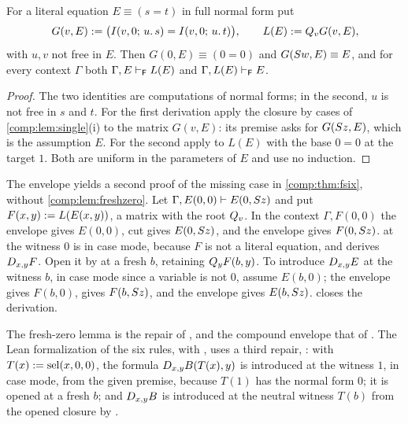 \begin{lemma}
\label{comp:lem:envelope}
For a literal equation $E\equiv(s=t)$ in full normal form put
\[
 G(v,E)\mathrel{:=}\bigl(I(v,0;\,u.\,s)=I(v,0;\,u.\,t)\bigr),\qquad
 L(E)\mathrel{:=}Q_{v}G(v,E),
\]
with $u,v$ not free in $E$. Then $G(0,E)\equiv(0=0)$ and
$G(S w,E)\equiv E$, and for every context $\Gamma$ both
$\Gamma,E\vdash_{\mathsf F}L(E)$ and $\Gamma,L(E)\vdash_{\mathsf F}E$.
\end{lemma}

\begin{proof}
The two identities are computations of normal forms; in the second, $u$ is
not free in $s$ and $t$. For the first derivation apply the closure by cases
of \cref{comp:lem:single}(i) to the matrix $G(v,E)$: its premise asks for
$G(S z,E)$, which is the assumption $E$. For the second apply
 to $L(E)$ with the base $0=0$ at the target $1$. Both are
uniform in the parameters of $E$ and use no induction.
\end{proof}

The envelope yields a second proof of the missing case in
\cref{comp:thm:fsix}, without \cref{comp:lem:freshzero}. Let
$\Gamma,E(0,0)\vdash E(0,S z)$ and put $F(x,y)\mathrel{:=} L(E(x,y))$, a
matrix with the root $Q_{v}$. In the context $\Gamma,F(0,0)$ the envelope
gives $E(0,0)$, cut gives $E(0,S z)$, and the envelope gives
$F(0,S z)$.  at the witness $0$ is in case mode, because
$F$ is not a literal equation, and derives $D_{x,y}F$. Open it by
 at a fresh $b$, retaining $Q_{y}F(b,y)$. To introduce
$D_{x,y}E$ at the witness $b$, in case mode since a variable is not $0$,
assume $E(b,0)$; the envelope gives $F(b,0)$,  gives
$F(b,S z)$, and the envelope gives $E(b,S z)$.  closes
the derivation.

\begin{remark}
The fresh-zero lemma is the repair of , and the
compound envelope that of . The Lean formalization
of the six rules,  with , uses a third
repair, : with $T(x)\mathrel{:=}\operatorname{sel}(x,0,0)$, the formula
$D_{x,y}B(T(x),y)$ is introduced at the witness $1$, in case mode, from
the given premise, because $T(1)$ has the normal form $0$; it is opened at
a fresh $b$; and $D_{x,y}B$ is introduced at the neutral witness $T(b)$
from the opened closure by .
\end{remark}

